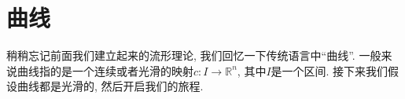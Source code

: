 \chapter{曲线}

稍稍忘记前面我们建立起来的流形理论, 我们回忆一下传统语言中``曲线''.
一般来说曲线指的是一个连续或者光滑的映射$c:I\to\mathbb{R}^n$, 其中$I$是一个区间.
接下来我们假设曲线都是光滑的, 然后开启我们的旅程.